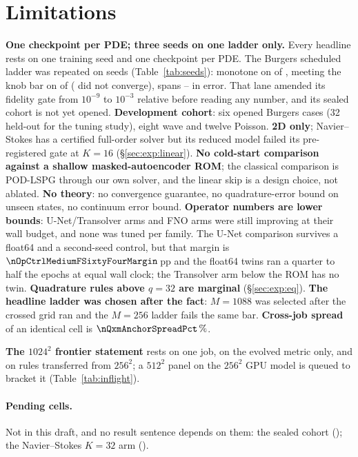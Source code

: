 \section{Limitations}
\label{sec:limitations}

\textbf{One checkpoint per PDE; three seeds on one ladder only.} Every
headline rests on one training seed and one checkpoint per PDE. The Burgers
scheduled ladder was repeated on \nSeedsCount{} seeds
(Table~\ref{tab:seeds}): monotone on \nSeedsMonotoneEvolved{} of
\nSeedsCount, meeting the knob bar on \nSeedsKnobBar{} of \nSeedsCount{}
(\nSeedsUnconvergedCells{} did not converge), spans
\nSeedsErrSpanMin--\nSeedsErrSpanMax{} in error. That lane amended its
fidelity gate from $10^{-9}$ to $10^{-3}$ relative before reading any number,
and its sealed cohort is not yet opened.
\textbf{Development cohort}: six opened Burgers cases (32 held-out for the
tuning study), eight wave and twelve Poisson.
\textbf{2D only}; Navier--Stokes has a certified full-order solver but its
reduced model failed its pre-registered gate at $K=16$ (\S\ref{sec:exp:linear}).
\textbf{No cold-start comparison against a shallow masked-autoencoder ROM}; the
classical comparison is POD-LSPG through our own solver, and the linear skip is
a design choice, not ablated. \textbf{No theory}: no convergence guarantee, no
quadrature-error bound on unseen states, no continuum error bound.
\textbf{Operator numbers are lower bounds}: \nOpLaneImproving{}
U-Net/Transolver arms and \nOpFnoImproving{} FNO arms were still improving at
their wall budget, and none was tuned per family. The U-Net comparison survives
a float64 and a second-seed control, but that margin is
$\nOpCtrlMediumFSixtyFourMargin$\,pp and the float64 twins ran a quarter to half
the epochs at equal wall clock; the Transolver arm below the ROM has no twin.
\textbf{Quadrature rules above $q=32$ are marginal} (\S\ref{sec:exp:eq}).
\textbf{The headline ladder was chosen after the fact}: $M=1088$ was selected
after the crossed grid ran and the $M=256$ ladder fails the same bar.
\textbf{Cross-job spread} of an identical cell is $\nQxmAnchorSpreadPct\,\%$.

\textbf{The $1024^2$ frontier statement} rests on one job, on the evolved
metric only, and on rules transferred from $256^2$; a $512^2$ panel on the
$256^2$ GPU model is queued to bracket it (Table~\ref{tab:inflight}).

\paragraph{Pending cells.} Not in this draft, and no result sentence depends on
them: the sealed cohort (\nSeedsStatus); the Navier--Stokes $K=32$ arm
(\nNsKthirtyTwo).
